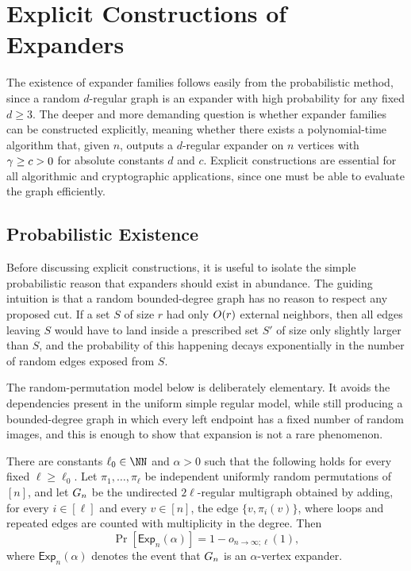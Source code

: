 \section{Explicit Constructions of Expanders}
\label{sec:constructions}

The existence of expander families follows easily from the probabilistic method, since a random \(d\)-regular graph is an expander with high probability for any fixed \(d\geq 3\). The deeper and more demanding question is whether expander families can be constructed explicitly, meaning whether there exists a polynomial-time algorithm that, given \(n\), outputs a \(d\)-regular expander on \(n\) vertices with \(\gamma\geq c>0\) for absolute constants \(d\) and \(c\). Explicit constructions are essential for all algorithmic and cryptographic applications, since one must be able to evaluate the graph efficiently.

\subsection{Probabilistic Existence}
\label{subsec:probabilistic-existence}

Before discussing explicit constructions, it is useful to isolate the simple probabilistic reason that expanders should exist in abundance. The guiding intuition is that a random bounded-degree graph has no reason to respect any proposed cut. If a set \(S\) of size \(r\) had only \(\bigO(r)\) external neighbors, then all edges leaving \(S\) would have to land inside a prescribed set \(S'\) of size only slightly larger than \(S\), and the probability of this happening decays exponentially in the number of random edges exposed from \(S\).

The random-permutation model below is deliberately elementary. It avoids the dependencies present in the uniform simple regular model, while still producing a bounded-degree graph in which every left endpoint has a fixed number of random images, and this is enough to show that expansion is not a rare phenomenon.

\begin{theorem}
	\label{thm:random-permutation-expanders}
	There are constants \(\ell_0\in\NN\) and \(\alpha>0\) such that the following holds for every fixed \(\ell\geq \ell_0\). Let \(\pi_1,\ldots,\pi_\ell\) be independent uniformly random permutations of \([n]\), and let \(G_n\) be the undirected \(2\ell\)-regular multigraph obtained by adding, for every \(i\in[\ell]\) and every \(v\in[n]\), the edge \(\{v,\pi_i(v)\}\), where loops and repeated edges are counted with multiplicity in the degree. Then
	\begin{equation}
		\label{eq:random-permutation-expansion-probability}
		\Pr[\mathsf{Exp}_n(\alpha)]=1-o_{n\to\infty;\ell}(1),
	\end{equation}
	where \(\mathsf{Exp}_n(\alpha)\) denotes the event that \(G_n\) is an \(\alpha\)-vertex expander.
\end{theorem}

